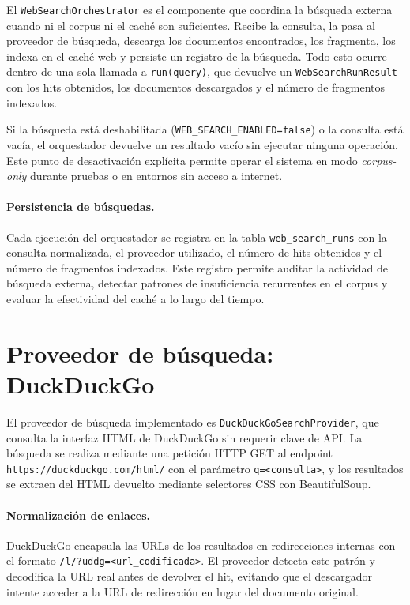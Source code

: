 \documentclass[11pt]{article}
\begin{document}
El \texttt{WebSearchOrchestrator} es el componente que coordina la búsqueda externa cuando
ni el corpus ni el caché son suficientes. Recibe la consulta, la pasa al proveedor de búsqueda,
descarga los documentos encontrados, los fragmenta, los indexa en el caché web y persiste un
registro de la búsqueda. Todo esto ocurre dentro de una sola llamada a \texttt{run(query)},
que devuelve un \texttt{WebSearchRunResult} con los hits obtenidos, los documentos descargados
y el número de fragmentos indexados.

Si la búsqueda está deshabilitada (\texttt{WEB\_SEARCH\_ENABLED=false}) o la consulta está
vacía, el orquestador devuelve un resultado vacío sin ejecutar ninguna operación. Este punto de
desactivación explícita permite operar el sistema en modo \emph{corpus-only} durante pruebas o
en entornos sin acceso a internet.

\paragraph{Persistencia de búsquedas.}
Cada ejecución del orquestador se registra en la tabla \texttt{web\_search\_runs} con la
consulta normalizada, el proveedor utilizado, el número de hits obtenidos y el número de
fragmentos indexados. Este registro permite auditar la actividad de búsqueda externa, detectar
patrones de insuficiencia recurrentes en el corpus y evaluar la efectividad del caché a lo
largo del tiempo.

\section{Proveedor de búsqueda: DuckDuckGo}

El proveedor de búsqueda implementado es \texttt{DuckDuckGoSearchProvider}, que consulta la
interfaz HTML de DuckDuckGo sin requerir clave de API. La búsqueda se realiza mediante una
petición HTTP GET al endpoint \texttt{https://duckduckgo.com/html/} con el parámetro
\texttt{q=<consulta>}, y los resultados se extraen del HTML devuelto mediante selectores CSS
con BeautifulSoup.

\paragraph{Normalización de enlaces.}
DuckDuckGo encapsula las URLs de los resultados en redirecciones internas con el formato
\texttt{/l/?uddg=<url\_codificada>}. El proveedor detecta este patrón y decodifica la URL
real antes de devolver el hit, evitando que el descargador intente acceder a la URL de
redirección en lugar del documento original.
\end{document}
